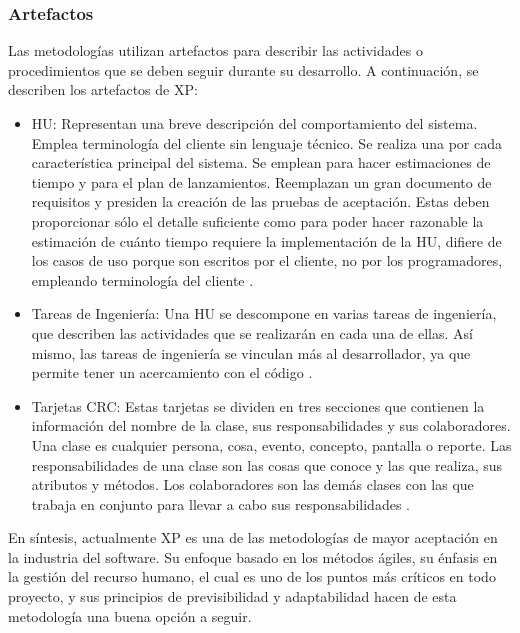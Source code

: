 \subsubsection{Artefactos}
    
Las metodologías utilizan artefactos para describir las actividades o procedimientos 
que se deben seguir durante su desarrollo. A continuación, se describen los 
artefactos de \ac{XP}:
    
\begin{itemize}
	\item \ac{HU}:
	Representan una breve descripción del comportamiento del sistema. Emplea terminología del cliente sin lenguaje técnico. Se realiza una por cada característica principal del sistema. Se emplean para hacer estimaciones de tiempo y para el plan de lanzamientos. Reemplazan un gran documento de requisitos y presiden la creación de las pruebas de aceptación. Estas deben proporcionar sólo el detalle suficiente como para poder hacer razonable la estimación de cuánto tiempo requiere la implementación de la \ac{HU}, difiere de los casos de uso porque son escritos por el cliente, no por los programadores, empleando terminología del cliente \citep{pressman2014se}.
	\item Tareas de Ingeniería:
	Una \ac{HU} se descompone en varias tareas de ingeniería, que describen las actividades que se realizarán en cada una de ellas. Así mismo, las tareas de ingeniería se vinculan más al desarrollador, ya que permite tener un acercamiento con el código \citep{pressman2014se}.
	\item Tarjetas \ac{CRC}:
	Estas tarjetas se dividen en tres secciones que contienen la información del nombre de la clase, sus responsabilidades y sus colaboradores. Una clase es cualquier persona, cosa, evento, concepto, pantalla o reporte. Las responsabilidades de una clase son las cosas que conoce y las que realiza, sus atributos y métodos. Los colaboradores son las demás clases con las que trabaja en conjunto para llevar a cabo sus responsabilidades \citep{pressman2014se}.
\end{itemize}
    
En síntesis, actualmente \ac{XP} es una de las metodologías de mayor aceptación en la 
industria del software. Su enfoque basado en los métodos ágiles, su énfasis en la 
gestión del recurso humano, el cual es uno de los puntos más críticos en todo proyecto, 
y sus principios de previsibilidad y adaptabilidad hacen de esta metodología una buena 
opción a seguir.
    
